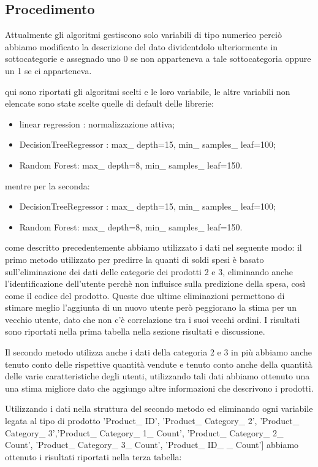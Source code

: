 \documentclass{article}
\begin{document}
\subsection{Procedimento}
Attualmente gli algoritmi gestiscono solo variabili di tipo numerico perciò abbiamo modificato la descrizione del dato dividentdolo ulteriormente in sottocategorie e assegnado uno 0 se non apparteneva a tale sottocategoria oppure un 1 se ci apparteneva.

qui sono riportati gli algoritmi scelti e le loro variabile, le altre variabili non elencate sono state scelte quelle di default delle librerie:
\begin{itemize}
\item linear regression : normalizzazione attiva;
\item DecisionTreeRegressor : max\_ depth=15, min\_ samples\_ leaf=100;
\item Random Forest: max\_ depth=8, min\_ samples\_ leaf=150.
\end{itemize}

mentre per la seconda:
\begin{itemize}
\item DecisionTreeRegressor : max\_ depth=15, min\_ samples\_ leaf=100;
\item Random Forest: max\_ depth=8, min\_ samples\_ leaf=150.
\end{itemize}

come descritto precedentemente abbiamo utilizzato i dati nel seguente modo:
il primo metodo utilizzato per predirre la quanti di soldi spesi è basato sull'eliminazione dei dati delle categorie dei prodotti 2 e 3, eliminando anche l'identificazione dell'utente perchè non influisce sulla predizione della spesa, così come il codice del prodotto.
Queste due ultime eliminazioni permettono di stimare meglio l'aggiunta di un nuovo utente però peggiorano la stima per un vecchio utente, dato che non c'è correlazione tra i suoi vecchi ordini. I risultati sono riportati nella prima tabella nella sezione risultati e discussione.

Il secondo metodo utilizza anche i dati della categoria 2 e 3 in più abbiamo anche tenuto conto delle rispettive quantità vendute e tenuto conto anche della quantità delle varie caratteristiche degli utenti, utilizzando tali dati abbiamo ottenuto una una stima migliore dato che aggiungo altre informazioni che descrivono i prodotti.

Utilizzando i dati nella struttura del secondo metodo ed eliminando ogni variabile legata al tipo di prodotto 'Product\_ ID', 'Product\_ Category\_ 2', 'Product\_ Category\_ 3','Product\_ Category\_ 1\_ Count', 'Product\_ Category\_ 2\_ Count', 'Product\_ Category\_ 3\_ Count', 'Product\_ ID\_ \_ Count'] abbiamo ottenuto i risultati riportati nella terza tabella:
\end{document}
